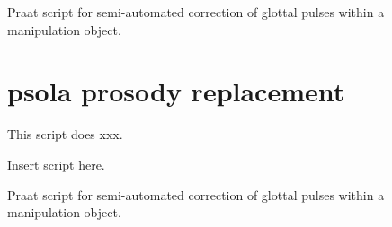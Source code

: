 \begin{code}
	\inputminted[fontsize=\footnotesize, tabsize=2]{r}{../scripts/SoundToManipulation_DissVersion.praat}
	\caption[Semi-auto pulse correction]{Praat script for semi-automated correction of glottal pulses within a manipulation object.\label{lst:PulseCor}}
\end{code}
\newpage

\section{\ac{psola} prosody replacement}
This script does xxx.

\begin{code}
	Insert script here.
	\caption[Semi-auto pulse correction]{Praat script for semi-automated correction of glottal pulses within a manipulation object.\label{lst:ProsPSOLA}}
\end{code}
